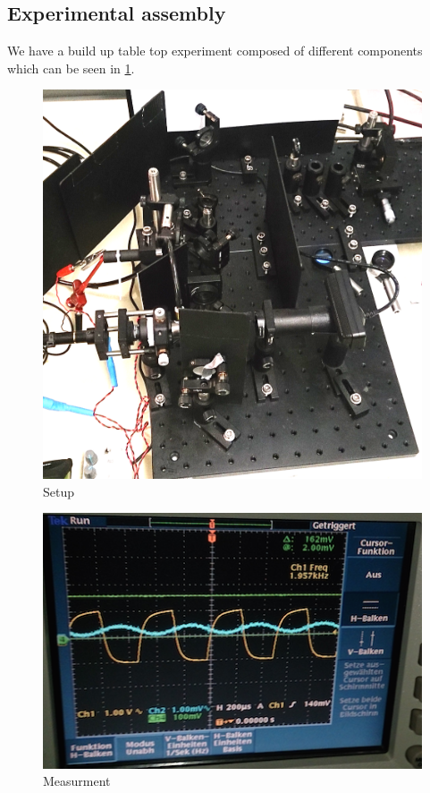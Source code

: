 \documentclass[12pt,a4paper]{article}
\begin{document}
\begin{multicols}{2}
\section{Experimental assembly}
We have a build up table top experiment composed of different components which can be seen in \ref{fig:setup}.\\
\begin{figure}[H]
	\centering
	\includegraphics[scale=0.2]{../figures/aufbau.png}
	\caption{Setup}
	\label{fig:setup}
\end{figure}


\begin{figure}[H]
	\centering
	\includegraphics[scale=0.5]{../figures/messung.png}
	\caption{Measurment}
	\label{fig:measurement}
\end{figure}


\end{multicols}
\end{document}
